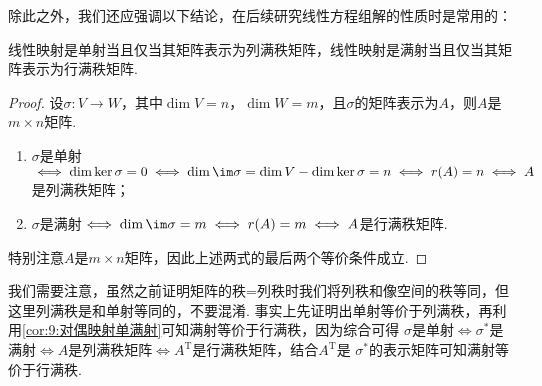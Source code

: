 除此之外，我们还应强调以下结论，在后续研究线性方程组解的性质时是常用的：
\begin{theorem}\label{thm:11:单满射与行列秩}
    线性映射是单射当且仅当其矩阵表示为列满秩矩阵，线性映射是满射当且仅当其矩阵表示为行满秩矩阵.
\end{theorem}
\begin{proof}
    设$\sigma:V\to W$，其中$\dim V=n$，$\dim W=m$，且$\sigma$的矩阵表示为$A$，则$A$是$m\times n$矩阵.
    \begin{enumerate}
        \item $\sigma$是单射$\iff\dim\ker\sigma=0\iff \dim\im\sigma=\dim V-\dim\ker\sigma=n\iff r(A)=n\iff A$是列满秩矩阵；
        \item $\sigma$是满射$\iff\dim\im\sigma=m\iff r(A)=m\iff A$是行满秩矩阵.
    \end{enumerate}
    特别注意$A$是$m\times n$矩阵，因此上述两式的最后两个等价条件成立.
\end{proof}

我们需要注意，虽然之前证明矩阵的秩=列秩时我们将列秩和像空间的秩等同，但这里列满秩是和单射等同的，不要混淆.
事实上先证明出单射等价于列满秩，再利用\autoref{cor:9:对偶映射单满射}可知满射等价于行满秩，因为综合可得
$\sigma$是单射$\iff\sigma^*$是满射$\iff A$是列满秩矩阵$\iff A^\mathrm{T}$是行满秩矩阵，结合$A^\mathrm{T}$是
$\sigma^*$的表示矩阵可知满射等价于行满秩.

